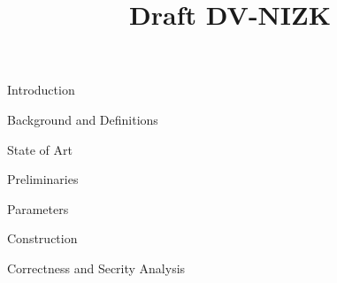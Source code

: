 



\pagestyle{plain}

\title{Draft DV-NIZK}

\maketitle

\begin{section}{Introduction}

\end{section}

\begin{section}{Background and Definitions}

\end{section}

\begin{section}{State of Art}

\end{section}

\begin{section}{Preliminaries}

\end{section}

\begin{section}{Parameters}

\end{section}

\begin{section}{Construction}

\end{section}


\begin{section}{Correctness and Secrity Analysis}

\end{section}










